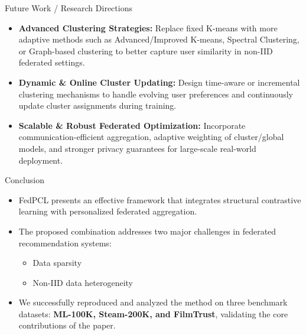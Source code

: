 \documentclass{beamer}
\begin{document}
\begin{frame}{Future Work / Research Directions}
\small
\begin{itemize}

\item \textbf{Advanced Clustering Strategies:}  
Replace fixed K-means with more adaptive methods such as 
Advanced/Improved K-means, Spectral Clustering, or Graph-based clustering 
to better capture user similarity in non-IID federated settings.

\item \textbf{Dynamic \& Online Cluster Updating:}  
Design time-aware or incremental clustering mechanisms 
to handle evolving user preferences and continuously update 
cluster assignments during training.

\item \textbf{Scalable \& Robust Federated Optimization:}  
Incorporate communication-efficient aggregation, adaptive weighting of cluster/global models, 
and stronger privacy guarantees for large-scale real-world deployment.

\end{itemize}

\end{frame}

\begin{frame}{Conclusion}
  \begin{itemize}
    \item FedPCL presents an effective framework that integrates structural contrastive learning with personalized federated aggregation.
    
    \item The proposed combination addresses two major challenges in federated recommendation systems:
    \begin{itemize}
        \item Data sparsity
        \item Non-IID data heterogeneity
    \end{itemize}
    
    \item We successfully reproduced and analyzed the method on three benchmark datasets:
    \textbf{ML-100K, Steam-200K, and FilmTrust}, validating the core contributions of the paper.
  \end{itemize}
\end{frame}
\end{document}
